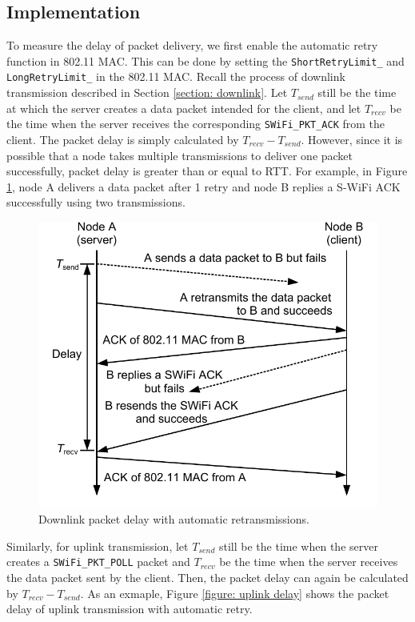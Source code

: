 \documentclass{article}
\begin{document}
\subsection{Implementation}
To measure the delay of packet delivery, we first enable the automatic retry function in 802.11 MAC. This can be done by setting the \lstinline|ShortRetryLimit_| and \lstinline|LongRetryLimit_| in the 802.11 MAC. Recall the process of downlink transmission described in Section \ref{section: downlink}. Let $T_{send}$ still be the time at which the server creates a data packet intended for the client, and let $T_{recv}$ be the time when the server receives the corresponding \lstinline|SWiFi_PKT_ACK| from the client. The packet delay is simply calculated by $T_{recv}-T_{send}$. However, since it is possible that a node takes multiple transmissions to deliver one packet successfully, packet delay is greater than or equal to RTT. For example, in Figure \ref{figure: downlink delay}, node A delivers a data packet after 1 retry and node B replies a S-WiFi ACK successfully using two transmissions.

\begin{figure}[htbp]
\centering
\includegraphics[scale = 0.7]{downlink_delay.pdf}
\caption{Downlink packet delay with automatic retransmissions.}
\label{figure: downlink delay}
\end{figure}

Similarly, for uplink transmission, let $T_{send}$ still be the time when the server creates a \lstinline|SWiFi_PKT_POLL| packet and $T_{recv}$ be the time when the server receives the data packet sent by the client. Then, the packet delay can again be calculated by $T_{recv}-T_{send}$. As an exmaple, Figure \ref{figure: uplink delay} shows the packet delay of uplink transmission with automatic retry.
\end{document}

